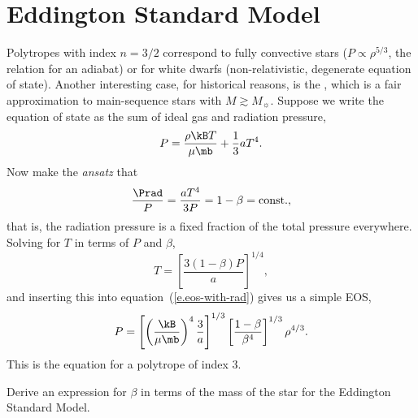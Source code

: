
\section{Eddington Standard Model}\label{s.LE-Eddington-Standard-Model}

Polytropes with index $n=3/2$ correspond to fully convective stars ($P \propto \rho^{5/3}$, the relation for an adiabat) or for white dwarfs (non-relativistic, degenerate equation of state). Another interesting case, for historical reasons, is the , which is a fair approximation to main-sequence stars with $M \gtrsim M_{\sun}$.  Suppose we write the equation of state as the sum of ideal gas and radiation pressure,
\begin{equation}\label{e.eos-with-rad}
 P  = \frac{\rho\kB T}{\mu \mb} + \frac{1}{3}a T^{4}.
\end{equation}
Now make the \emph{ansatz} that
\begin{equation}\label{e.beta-def}
\frac{\Prad}{P} = \frac{aT^{4}}{3P} = 1-\beta = \mathrm{const.},
\end{equation}
that is, the radiation pressure is a fixed fraction of the total pressure everywhere.
Solving for $T$ in terms of $P$ and $\beta$,
\[ T = \left[\frac{3(1-\beta) P}{a}\right]^{1/4}, \]
and inserting this into equation~(\ref{e.eos-with-rad}) gives us a simple EOS,
\begin{equation}\label{e.beta-eos}
P = \left[\left(\frac{\kB}{\mu\mb}\right)^{4}\frac{3}{a}\right]^{1/3}\left[\frac{1-\beta}{\beta^{4}}\right]^{1/3} \rho^{4/3}.
\end{equation}
This is the equation for a polytrope of index 3.

\begin{exercisebox}
\label{p.radiation-beta}
Derive an expression for $\beta$ in terms of the mass of the star for the Eddington Standard Model.
\end{exercisebox}

